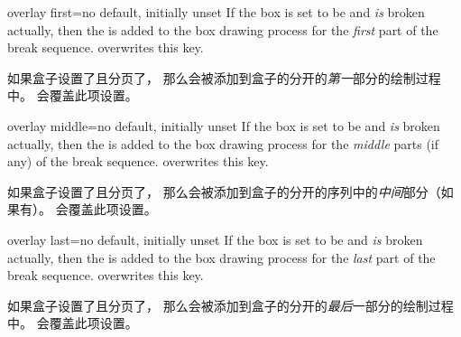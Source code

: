 \begin{docTcbKey}{overlay first}{=}{no default, initially unset}
 If the box is set to be  and \emph{is} broken actually,
 then the  is added to the box drawing process for
 the \emph{first} part of the break sequence.
  overwrites this key.


如果盒子设置了且分页了，%
那么会被添加到盒子的分开的\emph{第一}部分的绘制过程中。
会覆盖此项设置。
\end{docTcbKey}

\begin{docTcbKey}{overlay middle}{=}{no default, initially unset}
 If the box is set to be  and \emph{is} broken actually,
 then the  is added to the box drawing process for
 the \emph{middle} parts (if any) of the break sequence.
  overwrites this key.


如果盒子设置了且分页了，%
那么会被添加到盒子的分开的序列中的\emph{中间}部分（如果有）。 会覆盖此项设置。
\end{docTcbKey}

\begin{docTcbKey}{overlay last}{=}{no default, initially unset}
 If the box is set to be  and \emph{is} broken actually,
 then the  is added to the box drawing process for
 the \emph{last} part of the break sequence.
  overwrites this key.


如果盒子设置了且分页了，%
那么会被添加到盒子的分开的\emph{最后}一部分的绘制过程中。
会覆盖此项设置。
\end{docTcbKey}
